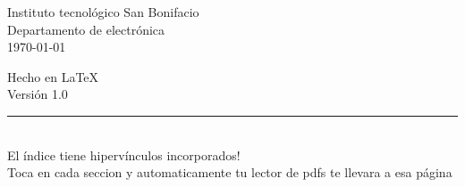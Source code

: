 \documentclass{article}
\begin{document}
\begin{titlepage}
	\vfill{}

	\begin{center}
		{\Large
			Instituto tecnológico San Bonifacio\\
			Departamento de electrónica\\
			\today
		}
		
		\vspace{0.5cm}
		{\large Hecho en \LaTeX\\
		Versión 1.0}\\
	\end{center}
\end{titlepage}

\tableofcontents		\noindent\rule{\textwidth}{0.7pt}
\\ El índice tiene hipervínculos incorporados!\\ 
Toca en cada seccion y automaticamente tu lector de pdfs te llevara a esa página\\\\

\end{document}
